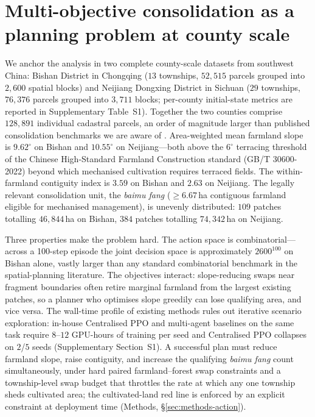 \documentclass[11pt]{article}
\begin{document}
\section{Multi-objective consolidation as a planning problem at county scale}\label{sec:problem}

We anchor the analysis in two complete county-scale datasets from southwest China: Bishan District in Chongqing ($13$ townships, $52{,}515$ parcels grouped into $2{,}600$ spatial blocks) and Neijiang Dongxing District in Sichuan ($29$ townships, $76{,}376$ parcels grouped into $3{,}711$ blocks; per-county initial-state metrics are reported in Supplementary Table~S1). Together the two counties comprise $128{,}891$ individual cadastral parcels, an order of magnitude larger than published consolidation benchmarks we are aware of \citep{cao2012boundary,zheng2023urban}. Area-weighted mean farmland slope is $9.62^{\circ}$ on Bishan and $10.55^{\circ}$ on Neijiang---both above the $6^{\circ}$ terracing threshold of the Chinese High-Standard Farmland Construction standard (GB/T 30600-2022) beyond which mechanised cultivation requires terraced fields. The within-farmland contiguity index is $3.59$ on Bishan and $2.63$ on Neijiang. The legally relevant consolidation unit, the \textit{baimu fang} ($\geq 6.67$\,ha contiguous farmland eligible for mechanised management), is unevenly distributed: $109$ patches totalling $46{,}844$\,ha on Bishan, $384$ patches totalling $74{,}342$\,ha on Neijiang.

Three properties make the problem hard. The action space is combinatorial---across a 100-step episode the joint decision space is approximately $2600^{100}$ on Bishan alone, vastly larger than any standard combinatorial benchmark in the spatial-planning literature. The objectives interact: slope-reducing swaps near fragment boundaries often retire marginal farmland from the largest existing patches, so a planner who optimises slope greedily can lose qualifying area, and vice versa. The wall-time profile of existing methods rules out iterative scenario exploration: in-house Centralised PPO and multi-agent baselines on the same task require $8$--$12$ GPU-hours of training per seed and Centralised PPO collapses on $2$/$5$ seeds (Supplementary Section~S1). A successful plan must reduce farmland slope, raise contiguity, and increase the qualifying \textit{baimu fang} count simultaneously, under hard paired farmland--forest swap constraints and a township-level swap budget that throttles the rate at which any one township sheds cultivated area; the cultivated-land red line is enforced by an explicit constraint at deployment time (Methods, \S\ref{sec:methods-action}).
\end{document}
